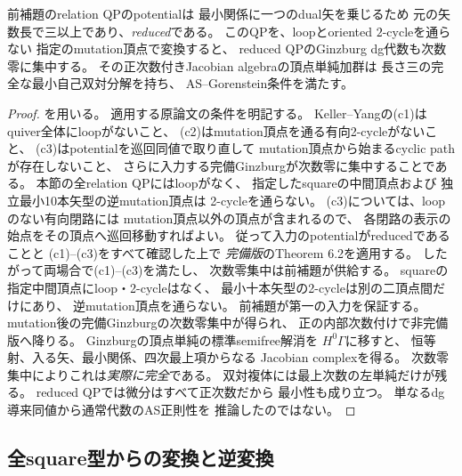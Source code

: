 \begin{lemma}[mutation後の最小AS分解]
\label{lem:qa-as10-keller-yang}
前補題のrelation QPのpotentialは
最小関係に一つのdual矢を乗じるため
元の矢数長で三以上であり、\emph{reduced}である。
このQPを、loopとoriented $2$-cycleを通らない
指定のmutation頂点で変換すると、
reduced QPのGinzburg dg代数も次数零に集中する。
その正次数付きJacobian algebraの頂点単純加群は
長さ三の完全な最小自己双対分解を持ち、
AS--Gorenstein条件を満たす。
\end{lemma}
\begin{proof}
\cite[Theorem 6.2]{KellerYang2011}を用いる。
適用する原論文の条件を明記する。
Keller--Yangの(c1)はquiver全体にloopがないこと、
(c2)はmutation頂点を通る有向2-cycleがないこと、
(c3)はpotentialを巡回同値で取り直して
mutation頂点から始まるcyclic pathが存在しないこと、
さらに入力する完備Ginzburgが次数零に集中することである。
本節の全relation QPにはloopがなく、
指定したsquareの中間頂点および
独立最小10本矢型の逆mutation頂点は
2-cycleを通らない。
(c3)については、loopのない有向閉路には
mutation頂点以外の頂点が含まれるので、
各閉路の表示の始点をその頂点へ巡回移動すればよい。
従って入力のpotentialがreducedであることと
(c1)--(c3)をすべて確認した上で
\emph{完備版}のTheorem 6.2を適用する。
したがって両場合で(c1)--(c3)を満たし、
次数零集中は前補題が供給する。
squareの指定中間頂点にloop・2-cycleはなく、
最小十本矢型の2-cycleは別の二頂点間だけにあり、
逆mutation頂点を通らない。
前補題が第一の入力を保証する。
mutation後の完備Ginzburgの次数零集中が得られ、
正の内部次数付けで非完備版へ降りる。
Ginzburgの頂点単純の標準semifree解消を
$H^0\Gamma$に移すと、
恒等射、入る矢、最小関係、四次最上項からなる
Jacobian complexを得る。
次数零集中によりこれは\emph{実際に完全}である。
双対複体には最上次数の左単純だけが残る。
reduced QPでは微分はすべて正次数だから
最小性も成り立つ。
単なるdg導来同値から通常代数のAS正則性を
推論したのではない。
\end{proof}


\subsection{全square型からの変換と逆変換}
\label{subsec:qa-as10-inverse-mutation}

